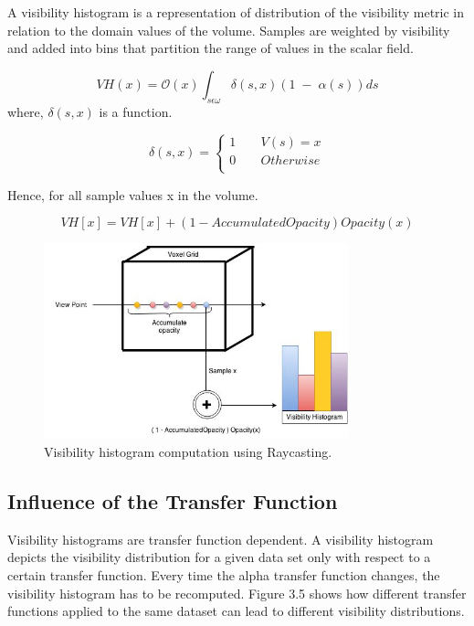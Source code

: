 A visibility histogram is a representation of distribution of the visibility metric in relation to the domain values of the volume. Samples are weighted by visibility and added into bins that partition the range of values in the scalar field. 

\begin{equation}
VH(x) =  \mathcal{O} (x) \int_{s \epsilon \omega} \delta(s, x) (1 \; - \; \alpha(s) ) ds 
\end{equation}
where, $ \delta(s, x) $ is a function.


\begin{equation}
    \delta(s, x)=\left\{
                \begin{array}{ll}
                  1  \;\;\;\;\;\;\;    V(s) = x\\
                  0  \;\;\;\;\;\;\;    Otherwise\\
                \end{array}
              \right.
\end{equation}

Hence, for all sample values x in the volume.

\begin{equation}
VH[x] = VH[x] + ( 1 - AccumulatedOpacity ) Opacity(x) 
\end{equation}

\begin{figure}
\centering
\includegraphics[width=250pt]{Images/VHistogram.jpg}
\caption{\label{fig:ray_cast1.jpg} Visibility histogram computation using Raycasting.}
\end{figure}


\subsection{Influence of the Transfer Function}

Visibility histograms are transfer function dependent. A visibility histogram depicts the visibility distribution for a given data set only
with respect to a certain transfer function. Every time the alpha transfer function changes, the visibility histogram has to be recomputed. Figure 3.5 shows how different transfer functions applied to the same dataset can lead to different visibility distributions. \\


